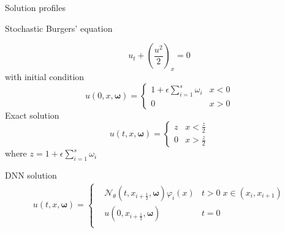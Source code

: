 \documentclass[aspectratio=169]{beamer}
\def\eps {{\epsilon}}
\def\om {{\omega}}
\begin{document}
\begin{frame}{Solution profiles}
\begin{figure}[htbp]
\centering
\end{figure}
\end{frame}

\begin{frame}{Stochastic Burgers' equation}

\begin{equation*}
 	u_t + (\frac{u^2}{2})_x = 0
 \end{equation*} 
with initial condition 
 \begin{equation*}
 	u(0,x,\boldsymbol{\omega}) = \left\{
 	\begin{matrix}
 		1+\epsilon \sum_{i=1}^s \omega_i & x<0 \\
 		 0 & x>0 
 	\end{matrix}
 	\right.
 \end{equation*}
Exact solution
\begin{equation*}
	 	u(t,x,\boldsymbol{\omega}) = \left\{
 	\begin{matrix}
 		z  & x< \frac{z}{2}\\
 		 0 & x>\frac{z}{2}
 	\end{matrix}
 	\right.
\end{equation*}
where $z = 1+\eps \sum_{i=1}^s \om_i$
\end{frame}

\begin{frame}{DNN solution}
 \begin{equation*}
 \begin{aligned}
 	u(t,x,\boldsymbol{\omega}) = \left\{\begin{matrix}
 		&\mathcal{N}_\theta(t,x_{i+\frac{1}{2}},\boldsymbol{\omega}) \varphi_i(x) &  t > 0 \; x\in(x_i,x_{i+1})\\
 		&u(0,x_{i+\frac{1}{2}},\boldsymbol{\omega}) &  t = 0 \\
 	\end{matrix}\right.
\end{aligned}
 \end{equation*}
\end{frame}
\end{document}
